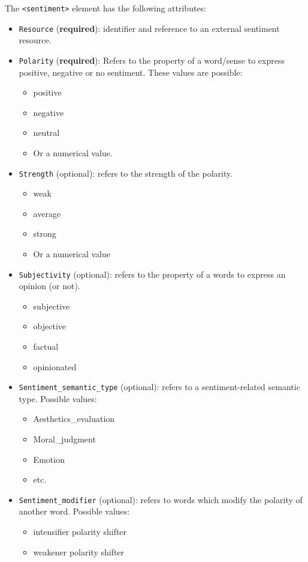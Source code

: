 The \texttt{<sentiment>} element has the following attributes:
\begin{itemize}
\item \texttt{Resource} (\textbf{required}): identifier and reference to an external sentiment
  resource.
\item \texttt{Polarity} (\textbf{required}): Refers to the property of a
  word/sense to express positive, negative or no sentiment. These values are
  possible:
  \begin{itemize}
  \item positive
  \item negative
  \item neutral
  \item Or a numerical value.
  \end{itemize}
\item \texttt{Strength} (optional): refers to the strength of the polarity.
  \begin{itemize}
  \item weak
  \item average
  \item strong
  \item Or a numerical value
  \end{itemize}
\item \texttt{Subjectivity} (optional): refers to the property of a words to express an
  opinion (or not).
  \begin{itemize}
  \item subjective
  \item objective
  \item factual
  \item opinionated
  \end{itemize}
\item \texttt{Sentiment\_semantic\_type} (optional): refers to a
  sentiment-related semantic type. Possible values:
  \begin{itemize}
  \item Aesthetics\_evaluation
  \item Moral\_judgment
  \item Emotion
  \item etc.
  \end{itemize}
\item \texttt{Sentiment\_modifier} (optional): refers to words which modify
  the polarity of another word. Possible values:
  \begin{itemize}
  \item intensifier polarity shifter
  \item weakener polarity shifter

\end{itemize}
\end{itemize}
